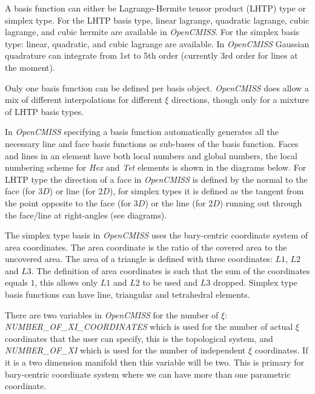 A basis function can either be Lagrange-Hermite tensor product (LHTP) type or 
simplex type. For the LHTP basis type, linear lagrange, quadratic lagrange, 
cubic lagrange, and cubic hermite are available in \emph{OpenCMISS}. For the 
simplex basis type: linear, quadratic, and cubic lagrange are available. In 
\emph{OpenCMISS} Gaussian quadrature can integrate from 1st to 5th order 
(currently 3rd order for lines at the moment). 

Only one basis function can be defined per basis object. \emph{OpenCMISS} does 
allow a mix of different interpolations for different $\xi$ directions, though 
only for a mixture of LHTP basis types. 

In \emph{OpenCMISS} specifying a basis function automatically generates all the 
necessary line and face basis functions as sub-bases of the basis function. 
Faces and lines in an element have both local numbers and global numbers, the 
local numbering scheme for \emph{Hex} and \emph{Tet} elements is shown in the 
diagrams below. For LHTP type the direction of a face in \emph{OpenCMISS} is
defined by the normal to the face (for $3D$) or line (for $2D$), for simplex 
types it is defined as the tangent from the point opposite to the face (for 
$3D$) or the line (for $2D$) running out through the face/line at 
right-angles (see diagrams).

The simplex type basis in \emph{OpenCMISS} uses the bary-centric coordinate 
system of area coordinates. The area coordinate is the ratio of the covered 
area to the uncovered area. The area of a triangle is defined with three 
coordinates: $L1$, $L2$ and $L3$. The definition of area coordinates is such 
that the sum of the coordinates equals $1$, this allows only $L1$ and $L2$ to 
be used and $L3$ dropped. Simplex type basis functions can have line,
triangular and tetrahedral elements. 

There are two variables in \emph{OpenCMISS} for the number of $\xi$: \\
\emph{NUMBER\_OF\_XI\_COORDINATES} which is used for the number of actual 
$\xi$ coordinates that the user can specify, this is the topological system, 
and \emph{NUMBER\_OF\_XI} which is used for the number of independent $\xi$ 
coordinates. If it is a two dimension manifold then this variable will be 
two. This is primary for bary-centric coordinate system where we can have 
more than one parametric coordinate.

